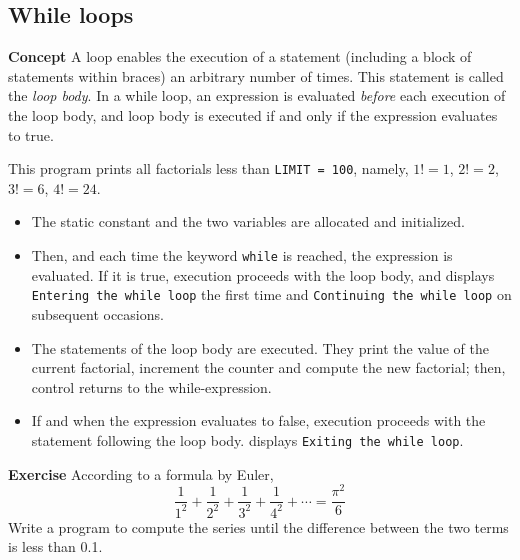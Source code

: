 \subsection{While loops}\label{control.03}

\textbf{Concept} A loop enables the execution of a statement (including a block
of statements within braces) an arbitrary number of times.
This statement is called the \emph{loop body}.
In a while loop, an expression is evaluated \emph{before} each
execution of the loop body,
and loop body is executed if and only if the expression evaluates to true.


This program prints all factorials less than \texttt{LIMIT = 100}, namely,
$1!=1$, $2!=2$, $3!=6$, $4!=24$.
\begin{itemize}
\item The static constant and the two variables are allocated and initialized.
\item Then, and each time the keyword \texttt{while} is reached, the expression
is evaluated. If it is true, execution proceeds with the loop body, and
\jel{} displays \texttt{Entering the while loop} the first time
and \texttt{Continuing the while loop} on subsequent occasions.
\item The statements of the loop body are executed. 
They print the value of the current factorial, increment the counter
and compute the new factorial; then, control returns to the while-expression.
\item If and when the expression evaluates to false, execution
proceeds with the statement following the loop body.
\jel{} displays \texttt{Exiting the while loop}.
\end{itemize}

\textbf{Exercise} According to a formula by Euler,
\begin{displaymath}
\frac{1}{1^{2}} + \frac{1}{2^{2}} + \frac{1}{3^{2}} + \frac{1}{4^{2}} + \cdots 
= \frac{\pi^{2}}{6}    
\end{displaymath}
Write a program to compute the series until the difference between the two terms
is less than 0.1.
